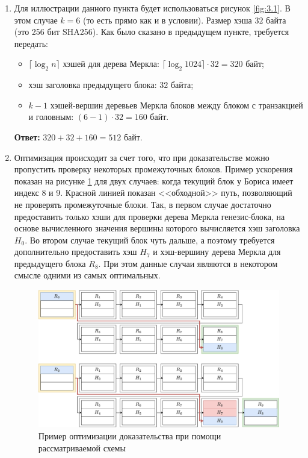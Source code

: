 \documentclass[12pt, a4paper]{extarticle}
\newcommand{\Answer}[1]{\textbf{Ответ:} #1}
\begin{document}
\begin{enumerate}
    \item Для иллюстрации данного пункта будет использоваться рисунок \ref{fig:3.1}. В этом случае $k = 6$
        (то есть прямо как и в условии). Размер хэша $32$ байта (это 256 бит SHA256). Как было сказано
        в предыдущем пункте, требуется передать:
        \begin{itemize}
            \item $\lceil \log_2 n \rceil$ хэшей для дерева Меркла: $\lceil \log_2 1024 \rceil \cdot 
                32 = 320$ байт;
            \item хэш заголовка предыдущего блока: $32$ байта;
            \item $k - 1$ хэшей-вершин деревьев Меркла блоков между блоком с транзакцией и головным:
                $(6 - 1) \cdot 32 = 160$ байт.
        \end{itemize}
        
        \Answer{$320 + 32 + 160 = 512$ байт.}
    
    \item Оптимизация происходит за счет того, что при доказательстве можно пропустить проверку
        некоторых промежуточных блоков. Пример ускорения показан на рисунке \ref{fig:3.3} для двух
        случаев: когда текущий блок у Бориса имеет индекс 8 и 9. Красной линией показан <<обходной>>
        путь, позволяющий не проверять промежуточные блоки. Так, в первом случае достаточно предоставить
        только хэши для проверки дерева Меркла генезис-блока, на основе вычисленного значения вершины
        которого вычисляется хэш заголовка $H_0$. Во втором случае текущий блок чуть дальше, а поэтому
        требуется дополнительно предоставить хэш $H_7$ и хэш-вершину дерева Меркла для предыдущего 
        блока $R_8$. При этом данные случаи являются в некотором смысле одними из самых оптимальных.
        \begin{figure}[h!]
            \centering
            \includegraphics[width=\textwidth]{3.3.png}
            \caption{Пример оптимизации доказательства при помощи рассматриваемой схемы}
            \label{fig:3.3}
        \end{figure}
        

\end{enumerate}
\end{document}
